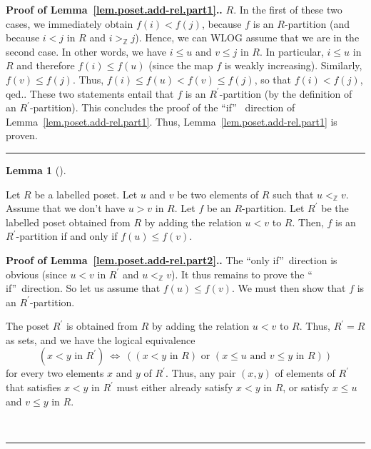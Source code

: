 \documentclass[numbers=enddot,12pt,final,onecolumn,notitlepage]{scrartcl}%
\theoremstyle{definition}
\newtheorem{lem}[theo]{Lemma}
\newenvironment{lemma}[1][]
{\begin{lem}[#1]\begin{leftbar}}
{\end{leftbar}\end{lem}}
\newenvironment{proof}[1][Proof]{\noindent\textbf{#1.} }{\ \rule{0.5em}{0.5em}}
\newenvironment{verlong}{}{}
\newcommand{\ZZ}{\mathbb{Z}}
\begin{document}
\begin{verlong}
\begin{proof}[Proof of Lemma~\ref{lem.poset.add-rel.part1}.]
{$R$. In the first of these two cases, we immediately obtain $f\left(
i\right)  <f\left(  j\right)  $, because $f$ is an $R$-partition (and because
$i<j$ in $R$ and $i>_{\ZZ}j$). Hence, we can WLOG assume that we are in
the second case. In other words, we have $i\leq u$ and $v\leq j$ in $R$. In
particular, $i\leq u$ in $R$ and therefore $f\left(  i\right)  \leq f\left(
u\right)  $ (since the map $f$ is weakly increasing). Similarly, $f\left(
v\right)  \leq f\left(  j\right)  $. Thus, $f\left(  i\right)  \leq f\left(
u\right)  <f\left(  v\right)  \leq f\left(  j\right)  $, so that $f\left(
i\right)  <f\left(  j\right)  $, qed.}. These two statements entail that $f$
is an $R^{\prime}$-partition (by the definition of an $R^{\prime}$-partition).
This concludes the proof of the \textquotedblleft if\textquotedblright%
\ direction of Lemma~\ref{lem.poset.add-rel.part1}.
Thus, Lemma~\ref{lem.poset.add-rel.part1} is proven.
\end{proof}

\begin{lemma}
\label{lem.poset.add-rel.part2}
Let $R$ be a labelled poset. Let $u$ and $v$ be
two elements of $R$ such that $u <_{\ZZ} v$.
Assume that we don't have $u > v$ in $R$.
Let $f$ be an $R$-partition.
Let $R^{\prime}$ be the labelled poset obtained from $R$ by adding the
relation $u < v$ to $R$.
Then, $f$ is an $R^{\prime}$-partition if and only if
$f \left(u\right) \leq f\left(v\right)$.
\end{lemma}

\begin{proof}[Proof of Lemma~\ref{lem.poset.add-rel.part2}.]
The \textquotedblleft only
if\textquotedblright\ direction is obvious (since $u<v$ in $R^{\prime}$ and
$u<_{\ZZ}v$). It thus remains to prove the \textquotedblleft
if\textquotedblright\ direction. So let us assume that $f\left(  u\right)
\leq f\left(  v\right)  $. We must then show that $f$ is an $R^{\prime}$-partition.

The poset $R^{\prime}$ is obtained from $R$ by adding the relation $u<v$ to
$R$. Thus, $R^{\prime}=R$ as sets, and we have the logical equivalence%
\[
\left(  x<y\text{ in }R^{\prime}\right)  \ \Longleftrightarrow\ \left(
\left(  x<y\text{ in }R\right)  \text{ or }\left(  x\leq u\text{ and }v\leq
y\text{ in }R\right)  \right)
\]
for every two elements $x$ and $y$ of $R^{\prime}$. Thus, any pair $\left(
x,y\right)  $ of elements of $R^{\prime}$ that satisfies $x<y$ in $R^{\prime}$
must either already satisfy $x<y$ in $R$, or satisfy $x\leq u$ and $v\leq y$
in $R$.


\end{proof}
\end{verlong}
\end{document}
